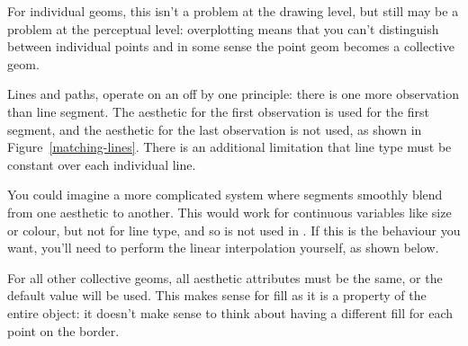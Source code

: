 
For individual geoms, this isn't a problem at the drawing level, but still may be a problem at the perceptual level: overplotting means that you can't distinguish between individual points and in some sense the point geom becomes a collective geom.

Lines and paths, operate on an off by one principle: there is one more observation than line segment.   The aesthetic for the first observation is used for the first segment, and the aesthetic for the last observation is not used, as shown in Figure~\ref{matching-lines}.  There is an additional limitation that line type must be constant over each individual line.

% 


You could imagine a more complicated system where segments smoothly blend from one aesthetic to another.  This would work for continuous variables like size or colour, but not for line type, and so is not used in \ggplot.  If this is the behaviour you want, you'll need to perform the linear interpolation yourself, as shown below.  

% 


For all other collective geoms, all aesthetic attributes must be the same, or the default value will be used.  This makes sense for fill as it is a property of the entire object: it doesn't make sense to think about having a different fill for each point on the border.

